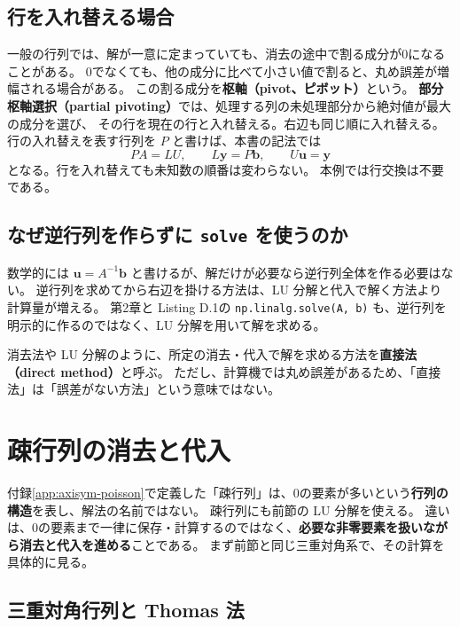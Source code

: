\subsection{行を入れ替える場合}
一般の行列では、解が一意に定まっていても、消去の途中で割る成分が0になることがある。
0でなくても、他の成分に比べて小さい値で割ると、丸め誤差が増幅される場合がある。
この割る成分を\textbf{枢軸（pivot、ピボット）}という。
\textbf{部分枢軸選択（partial pivoting）}では、処理する列の未処理部分から絶対値が最大の成分を選び、
その行を現在の行と入れ替える。右辺も同じ順に入れ替える。
行の入れ替えを表す行列を $P$ と書けば、本書の記法では
\begin{equation}
 PA=LU,\qquad L\boldsymbol y=P\boldsymbol b,\qquad U\boldsymbol u=\boldsymbol y
\label{eq:appD-pivot-lu}
\end{equation}
となる。行を入れ替えても未知数の順番は変わらない。
本例では行交換は不要である\cite{kouya2021}。

\subsection{なぜ逆行列を作らずに \texttt{solve} を使うのか}
数学的には $\boldsymbol u=A^{-1}\boldsymbol b$ と書けるが、解だけが必要なら逆行列全体を作る必要はない。
逆行列を求めてから右辺を掛ける方法は、LU 分解と代入で解く方法より計算量が増える\cite{kouya2021}。
第2章と Listing D.1の \texttt{np.linalg.solve(A, b)} も、逆行列を明示的に作るのではなく、LU 分解を用いて解を求める。

消去法や LU 分解のように、所定の消去・代入で解を求める方法を\textbf{直接法（direct method）}と呼ぶ。
ただし、計算機では丸め誤差があるため、「直接法」は「誤差がない方法」という意味ではない。

\section{疎行列の消去と代入}
\label{sec:appD-sparse}

付録\ref{app:axisym-poisson}で定義した「疎行列」は、0の要素が多いという\textbf{行列の構造}を表し、解法の名前ではない。
疎行列にも前節の LU 分解を使える。
違いは、0の要素まで一律に保存・計算するのではなく、\textbf{必要な非零要素を扱いながら消去と代入を進める}ことである。
まず前節と同じ三重対角系で、その計算を具体的に見る。

\subsection{三重対角行列と Thomas 法}

